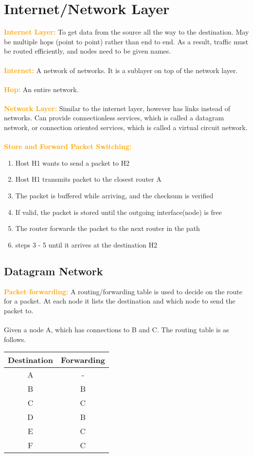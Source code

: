 \documentclass[a4paper,10pt]{article}
\begin{document}
\section{Internet/Network Layer}
\textcolor{Orange}{\textbf{Internet Layer:}} To get data from the source all the way to the destination. May be multiple hops (point to point) rather than end to end. As a result, traffic must be routed efficiently, and nodes need to be given names. \\\\ 
\textcolor{Orange}{\textbf{Internet:}} A network of networks. It is a sublayer on top of the network layer. \\\\
\textcolor{Orange}{\textbf{Hop:}} An entire network. \\\\
\textcolor{Orange}{\textbf{Network Layer:}} Similar to the internet layer, however has links instead of networks. Can provide connectionless services, which is called a datagram network, or connection oriented services, which is called a virtual circuit network. \\\\
\textcolor{Orange}{\textbf{Store and Forward Packet Switching:}} 
\begin{enumerate}
	\item Host H1 wants to send a packet to H2 
	\item Host H1 transmits packet to the closest router A 
	\item The packet is buffered while arriving, and the checksum is verified 
	\item If valid, the packet is stored until the outgoing interface(node) is free
	\item The router forwards the packet to the next router in the path 
	\item steps 3 - 5 until it arrives at the destination H2
\end{enumerate}
\newpage 
\subsection{Datagram Network}
\textcolor{Orange}{\textbf{Packet forwarding:}} A routing/forwarding table is used to decide on the route for a packet. At each node it lists the destination and which node to send the packet to. \\\\
Given a node A, which has connections to B and C. The routing table is as follows. 
\begin{center}
	\begin{tabular}{|c|c|}
		\hline 
		Destination &Forwarding \\
		\hline 
		A &- \\
		\hline 
		B &B \\
		\hline
		C &C \\
		\hline
		D &B \\
		\hline
		E &C \\
		\hline
		F &C \\
		\hline
	\end{tabular}
\end{center}
\end{document}
